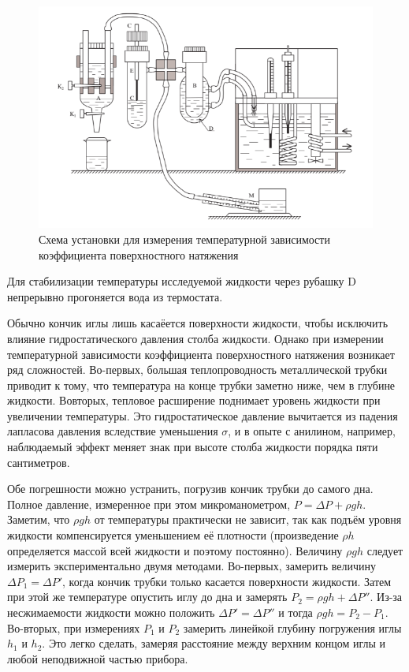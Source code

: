 \documentclass[12pt]{article}
\begin{document}
    \begin{figure}[H]
        \centering
        \includegraphics[scale=2]{stand.png}
        \caption{
        Схема установки для измерения температурной зависимости 
        коэффициента поверхностного натяжения
        }
    \end{figure} 
    Для стабилизации температуры исследуемой жидкости через рубашку D непрерывно
    прогоняется вода из термостата.

    Обычно кончик иглы лишь касаёется поверхности жидкости, чтобы исключить
    влияние гидростатического давления столба жидкости. Однако при измерении
    температурной зависимости коэффициента поверхностного натяжения возникает
    ряд сложностей. Во-первых, большая теплопроводность металлической трубки
    приводит к тому, что температура на конце трубки заметно ниже, чем в глубине
    жидкости. Вовторых, тепловое расширение поднимает уровень жидкости при
    увеличении температуры. Это гидростатическое давление вычитается из падения
    лапласова давления вследствие уменьшения $\sigma$, и в опыте с анилином,
    например, наблюдаемый эффект меняет знак при высоте столба жидкости порядка
    пяти сантиметров.
    
    Обе погрешности можно устранить, погрузив кончик трубки до самого дна.
    Полное давление, измеренное при этом микроманометром, $P=\Delta P+\rho g h$.
    Заметим, что $\rho g h$ от температуры практически не зависит, так как
    подъём уровня жидкости компенсируется уменьшением её плотности (произведение
    $\rho h$ определяется массой всей жидкости и поэтому постоянно). Величину
    $\rho g h$ следует измерить экспериментально двумя методами. Во-первых, 
    замерить величину $\Delta P_1 = \Delta P'$, когда кончик трубки только
    касается поверхности жидкости. Затем при этой же температуре опустить иглу
    до дна и замерять $P_2 = \rho gh + \Delta P''$. Из-за несжимаемости 
    жидкости можно положить $\Delta P' = \Delta P''$ и тогда $\rho gh = P_2 -
    P_1$. Во-вторых, при измерениях $P_1$ и $P_2$ замерить линейкой глубину
    погружения иглы $h_1$ и $h_2$. Это легко сделать, замеряя расстояние 
    между верхним концом иглы и любой неподвижной частью прибора.
\end{document}
